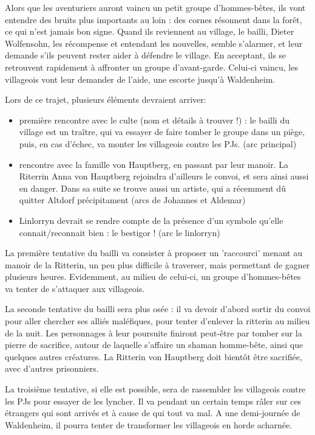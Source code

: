 \documentclass[10pt,a4paper]{book}
\begin{document}
Alors que les aventuriers auront vaincu un petit groupe d'hommes-bêtes, ils vont entendre des bruits plus importants au loin : des cornes résonnent dans la forêt, ce qui n'est jamais bon signe. Quand ils reviennent au village, le bailli, Dieter Wolfensohn, les récompense et entendant les nouvelles, semble s'alarmer, et leur demande s'ils peuvent rester aider à défendre le village. En acceptant, ils se retrouvent rapidement à affronter un groupe d'avant-garde. Celui-ci vaincu, les villageois vont leur demander de l'aide, une escorte jusqu'à Waldenheim.

Lors de ce trajet, plusieurs éléments devraient arriver:
\begin{itemize}
\item première rencontre avec le culte (nom et détails à trouver !) : le bailli du village est un traître, qui va essayer de faire tomber le groupe dans un piège, puis, en cas d'échec, va monter les villageois contre les PJs. (arc principal)
\item rencontre avec la famille von Hauptberg, en passant par leur manoir. La Riterrin Anna von Hauptberg rejoindra d'ailleurs le convoi, et sera ainsi aussi en danger. Dans sa suite se trouve aussi un artiste, qui a récemment dû quitter Altdorf précipitament (arcs de Johannes et Aldemar)
\item Linlorryn devrait se rendre compte de la présence d'un symbole qu'elle connait/reconnait bien : le bestigor ! (arc le linlorryn)
\end{itemize}

La première tentative du bailli va consister à proposer un 'raccourci' menant au manoir de la Ritterin, un peu plus difficile à traverser, mais permettant de gagner plusieurs heures. Evidemment, au milieu de celui-ci, un groupe d'hommes-bêtes va tenter de s'attaquer aux villageois.

La seconde tentative du bailli sera plus osée : il va devoir d'abord sortir du convoi pour aller chercher ses alliés maléfiques, pour tenter d'enlever la ritterin au milieu de la nuit. Les personnages à leur poursuite finiront peut-être par tomber sur la pierre de sacrifice, autour de laquelle s'affaire un shaman homme-bête, ainsi que quelques autres créatures. La Ritterin von Hauptberg doit bientôt être sacrifiée, avec d'autres prisonniers.

La troisième tentative, si elle est possible, sera de rassembler les villageois contre les PJs pour essayer de les lyncher. Il va pendant un certain temps râler sur ces étrangers qui sont arrivés et à cause de qui tout  va mal. A une demi-journée de Waldenheim, il pourra tenter de transformer les villageois en horde acharnée.
\end{document}
